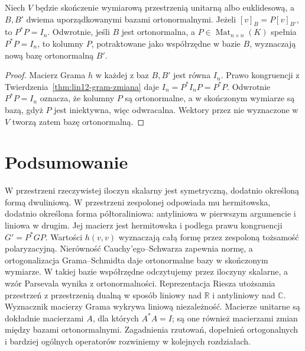 \begin{stwierdzenie}
\label{prop:lin12-zmiana-ortonormalna}
Niech \(V\) będzie skończenie
wymiarową przestrzenią unitarną
albo euklidesową, a
\(B,B'\) dwiema uporządkowanymi
bazami ortonormalnymi.
Jeżeli \([v]_B=P[v]_{B'}\),
to \(P^*P=I_n\).
Odwrotnie, jeśli \(B\) jest
ortonormalna, a
\(P\in\operatorname{Mat}_{n\times n}(K)\)
spełnia \(P^*P=I_n\),
to kolumny \(P\), potraktowane
jako współrzędne w bazie \(B\),
wyznaczają nową bazę
ortonormalną \(B'\).
\end{stwierdzenie}
\begin{proof}
Macierz Grama \(h\) w każdej
z baz \(B,B'\) jest równa \(I_n\).
Prawo kongruencji z
Twierdzenia~\ref{thm:lin12-gram-zmiana}
daje
\(I_n=P^*I_nP=P^*P\).
Odwrotnie \(P^*P=I_n\)
oznacza, że kolumny \(P\)
są ortonormalne, a w
skończonym wymiarze
są bazą, gdyż \(P\)
jest iniektywna, więc
odwracalna. Wektory przez
nie wyznaczone w \(V\)
tworzą zatem bazę ortonormalną.
\end{proof}

\section{Podsumowanie}
\label{sec:lin12-podsumowanie}

W przestrzeni rzeczywistej iloczyn
skalarny jest symetryczną,
dodatnio określoną formą
dwuliniową. W przestrzeni
zespolonej odpowiada mu
hermitowska, dodatnio określona
forma półtoraliniowa: antyliniowa w pierwszym argumencie
i liniowa w drugim.
Jej macierz jest hermitowska
i podlega prawu kongruencji
\(G'=P^*GP\).
Wartości \(h(v,v)\) wyznaczają
całą formę przez zespoloną
tożsamość polaryzacyjną.
Nierówność Cauchy'ego--Schwarza
zapewnia normę, a ortogonalizacja
Grama--Schmidta daje
ortonormalne bazy w skończonym
wymiarze. W takiej bazie
współrzędne odczytujemy przez
iloczyny skalarne, a wzór Parsevala
wynika z ortonormalności.
Reprezentacja Riesza
utożsamia przestrzeń z przestrzenią dualną
w sposób liniowy nad \(\mathbb R\)
i antyliniowy nad \(\mathbb C\).
Wyznacznik macierzy Grama
wykrywa liniową niezależność.
Macierze unitarne są dokładnie
macierzami \(A\), dla których
\(A^*A=I\); są one również
macierzami zmian między bazami
ortonormalnymi. Zagadnienia
rzutowań, dopełnień ortogonalnych
i bardziej ogólnych operatorów
rozwiniemy w kolejnych rozdziałach.
